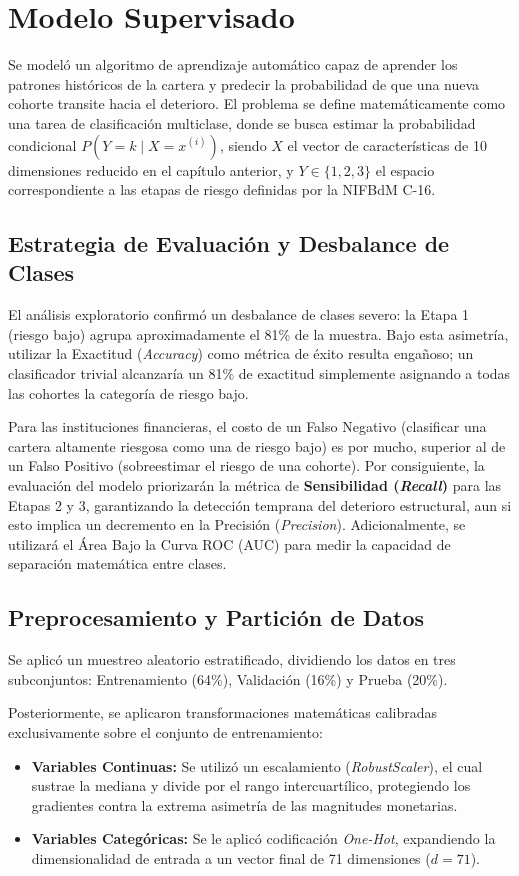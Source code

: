 \section{Modelo Supervisado}

Se modeló un algoritmo de aprendizaje automático capaz de aprender los patrones históricos de la cartera y predecir la probabilidad de que una nueva cohorte transite hacia el deterioro. El problema se define matemáticamente como una tarea de clasificación multiclase, donde se busca estimar la probabilidad condicional $P(Y=k \mid X=x^{(i)})$, siendo $X$ el vector de características de 10 dimensiones reducido en el capítulo anterior, y $Y \in \{1, 2, 3\}$ el espacio correspondiente a las etapas de riesgo definidas por la NIFBdM C-16.

\subsection{Estrategia de Evaluación y Desbalance de Clases}
El análisis exploratorio confirmó un desbalance de clases severo: la Etapa 1 (riesgo bajo) agrupa aproximadamente el 81\% de la muestra. Bajo esta asimetría, utilizar la Exactitud (\textit{Accuracy}) como métrica de éxito resulta engañoso; un clasificador trivial alcanzaría un 81\% de exactitud simplemente asignando a todas las cohortes la categoría de riesgo bajo.

Para las instituciones financieras, el costo de un Falso Negativo (clasificar una cartera altamente riesgosa como una de riesgo bajo) es por mucho, superior al de un Falso Positivo (sobreestimar el riesgo de una cohorte). Por consiguiente, la evaluación del modelo priorizarán la métrica de \textbf{Sensibilidad (\textit{Recall})} para las Etapas 2 y 3, garantizando la detección temprana del deterioro estructural, aun si esto implica un decremento en la Precisión (\textit{Precision}). Adicionalmente, se utilizará el Área Bajo la Curva ROC (AUC) para medir la capacidad de separación matemática entre clases.

\subsection{Preprocesamiento y Partición de Datos}
Se aplicó un muestreo aleatorio estratificado, dividiendo los datos en tres subconjuntos: Entrenamiento (64\%), Validación (16\%) y Prueba (20\%). 

Posteriormente, se aplicaron transformaciones matemáticas calibradas exclusivamente sobre el conjunto de entrenamiento:
\begin{itemize}
	\item \textbf{Variables Continuas:} Se utilizó un escalamiento (\textit{RobustScaler}), el cual sustrae la mediana y divide por el rango intercuartílico, protegiendo los gradientes contra la extrema asimetría de las magnitudes monetarias.
	\item \textbf{Variables Categóricas:} Se le aplicó codificación \textit{One-Hot}, expandiendo la dimensionalidad de entrada a un vector final de 71 dimensiones ($d=71$).
\end{itemize}

